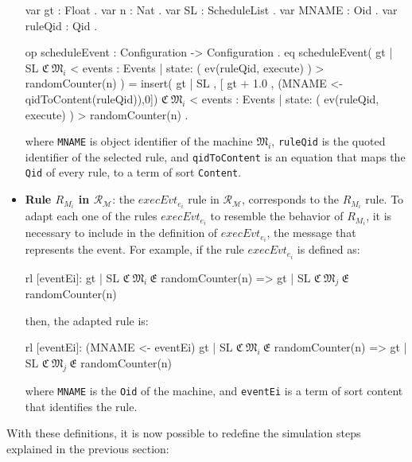 \begin{itemize}
\begin{maude}
var gt : Float .
var n : Nat .
var SL : ScheduleList .
var MNAME : Oid .
var ruleQid : Qid .
 
op scheduleEvent : Configuration -> Configuration .
eq scheduleEvent( { gt | SL } 
                  {$\mathfrak{C} \ \mathfrak{M}_{i} $ 
                  < events  : Events  | state: ( ev(ruleQid, execute) ) > 
                  randomCounter(n)} )
                 =
                  insert({ gt | SL },
                         [ gt + 1.0 , (MNAME <- qidToContent(ruleQid)),0]) 
                  {$\mathfrak{C} \ \mathfrak{M}_{i} $ 
                  < events  : Events  | state: ( ev(ruleQid, execute) ) > 
                  randomCounter(n)} .\end{maude}
    where \texttt{MNAME} is object identifier of the machine $\mathfrak{M}_{i}$, \texttt{ruleQid} is the quoted identifier of the selected rule, and \texttt{qidToContent} is an equation that maps the \texttt{Qid} of every rule, to a term of sort \texttt{Content}.

    \item \textbf{Rule $R_{M_i}$ in $\mathscr{R}_\mathscr{M}$}: the $execEvt_{e_i}$ rule in $\mathscr{R}_\mathscr{M}$, corresponds to the $R_{M_i}$ rule. To adapt each one of the rules $execEvt_{e_i}$ to resemble the behavior of $R_{M_i}$, it is necessary to include in the definition of $execEvt_{e_i}$, the message that represents the event. For example, if the rule $execEvt_{e_i}$ is defined as:
    \begin{maude}

rl [eventEi]: { gt | SL } $\mathfrak{C} \ \mathfrak{M}_{i}  \ \mathfrak{E}$ randomCounter(n)
              => 
              { gt | SL } $\mathfrak{C} \ \mathfrak{M}_{j}  \ \mathfrak{E}$ randomCounter(n)\end{maude}
    then, the adapted rule is:
    \begin{maude}

rl [eventEi]: (MNAME <- eventEi) { gt | SL } $\mathfrak{C} \ \mathfrak{M}_{i}  \ \mathfrak{E}$ randomCounter(n)
              => 
              { gt | SL } $\mathfrak{C} \ \mathfrak{M}_{j}  \ \mathfrak{E}$ randomCounter(n)\end{maude}
where \texttt{MNAME} is the \texttt{Oid} of the machine, and \texttt{eventEi} is a term of sort content that identifies the rule.
\end{itemize}

With these definitions, it is now possible to redefine the simulation steps explained in the previous section:

